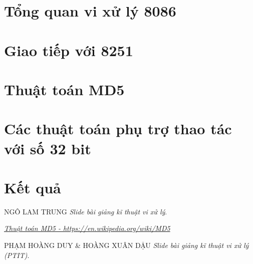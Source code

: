 \documentclass[12pt]{report}
\begin{document}


\tableofcontents 
\newpage

\newpage
\setcounter{page}{1}

\section{Tổng quan vi xử lý 8086}


\section{Giao tiếp với 8251}


\section{Thuật toán MD5}


\section{Các thuật toán phụ trợ thao tác với số 32 bit}


\section{Kết quả}


\begin{thebibliography}{9}
	NGÔ LAM TRUNG
	\textit{Slide bài giảng kĩ thuật vi xử lý}. 

	\href{https://en.wikipedia.org/wiki/MD5}
	\textit{Thuật toán MD5 - https://en.wikipedia.org/wiki/MD5}

	PHẠM HOÀNG DUY \& HOÀNG XUÂN DẬU
	\textit{Slide bài giảng kĩ thuật vi xử lý (PTIT)}. 




	
\end{thebibliography}
\end{document}

